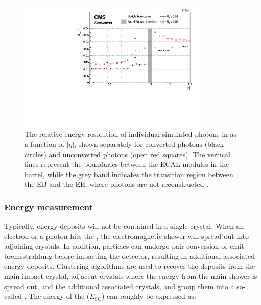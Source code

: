 \begin{figure}[h]
\centering
\includegraphics[width=0.8\textwidth]{detectorFigures/effSigma_vs_Eta_mva.pdf}
\caption{The relative energy resolution of individual simulated \Hgg photons in \RunI as a function of $|\eta|$, shown separately for converted photons (black circles) and unconverted photons (open red squares). The vertical lines represent the boundaries between the ECAL modules in the barrel, while the grey band indicates the transition region between the EB and the EE, where photons are not reconstructed \cite{CMS-PAS-EGM-14-001}.}
\label{fig:det:energy_resol}
\end{figure}

\subsubsection{Energy measurement}
\label{sec:cms:ecal:energymeasurement}

Typically, energy deposits will not be contained in a single crystal. When an electron or a photon hits the \ECAL, the electromagnetic shower will spread out into adjoining crystals. In addition, particles can undergo pair conversion or emit bremsstrahlung before impacting the detector, resulting in additional associated energy deposits.
Clustering algorithms are used to recover the deposits from the main impact crystal, adjacent crystals where the energy from the main shower is spread out, and the additional associated crystals, and group them into a so-called \SC. %
The energy of the \SC ($E_{\textrm{SC}}$) can roughly be expressed as: 

